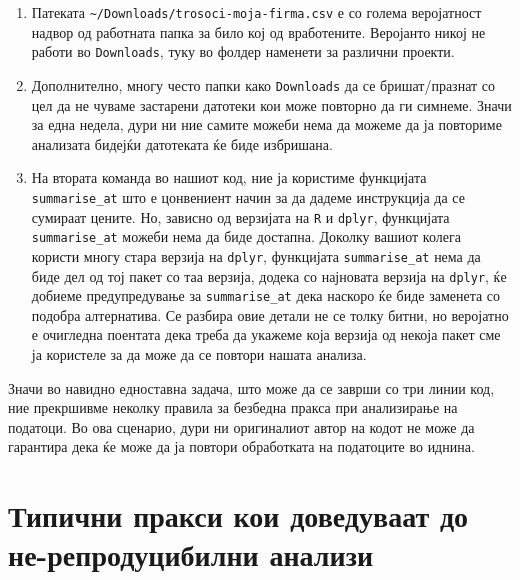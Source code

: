 \documentclass[
]{book}
\begin{document}
\begin{enumerate}
\def\labelenumi{\arabic{enumi}.}
\setcounter{enumi}{3}
\item
  Патеката \texttt{\textasciitilde{}/Downloads/trosoci-moja-firma.csv} е со голема веројатност надвор од работната папка за било кој од вработените. Веројанто никој не работи во \texttt{Downloads}, туку во фолдер наменети за различни проекти.
\item
  Дополнително, многу често папки како \texttt{Downloads} да се бришат/празнат со цел да не чуваме застарени датотеки кои може повторно да ги симнеме. Значи за една недела, дури ни ние самите можеби нема да можеме да ја повториме анализата бидејќи датотеката ќе биде избришана.
\item
  На втората команда во нашиот код, ние ја користиме функцијата \texttt{summarise\_at} што е цонвениент начин за да дадеме инструкција да се сумираат цените. Но, зависно од верзијата на \texttt{R} и \texttt{dplyr}, функцијата \texttt{summarise\_at} можеби нема да биде достапна. Доколку вашиот колега користи многу стара верзија на \texttt{dplyr}, функцијата \texttt{summarise\_at} нема да биде дел од тој пакет со таа верзија, додека со најновата верзија на \texttt{dplyr}, ќе добиеме предупредување за \texttt{summarise\_at} дека наскоро ќе биде заменета со подобра алтернатива. Се разбира овие детали не се толку битни, но веројатно е очигледна поентата дека треба да укажеме која верзија од некоја пакет сме ја користеле за да може да се повтори нашата анализа.
\end{enumerate}

Значи во навидно едноставна задача, што може да се заврши со три линии код, ние прекршивме неколку правила за безбедна пракса при анализирање на податоци. Во ова сценарио, дури ни оригиналиот автор на кодот не може да гарантира дека ќе може да ја повтори обработката на податоците во иднина.

\hypertarget{ux442ux438ux43fux438ux447ux43dux438-ux43fux440ux430ux43aux441ux438-ux43aux43eux438-ux434ux43eux432ux435ux434ux443ux432ux430ux430ux442-ux434ux43e-ux43dux435-ux440ux435ux43fux440ux43eux434ux443ux446ux438ux431ux438ux43bux43dux438-ux430ux43dux430ux43bux438ux437ux438}{%
\section{Типични пракси кои доведуваат до не-репродуцибилни анализи}\label{ux442ux438ux43fux438ux447ux43dux438-ux43fux440ux430ux43aux441ux438-ux43aux43eux438-ux434ux43eux432ux435ux434ux443ux432ux430ux430ux442-ux434ux43e-ux43dux435-ux440ux435ux43fux440ux43eux434ux443ux446ux438ux431ux438ux43bux43dux438-ux430ux43dux430ux43bux438ux437ux438}}
\end{document}
